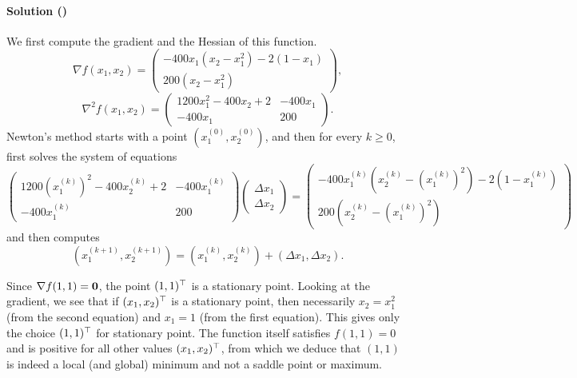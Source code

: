 \documentclass{article}
\newcounter{problems}
\renewcommand{\solution}[1]{\paragraph{Solution (\theproblems)}\addtocounter{problems}{1}\label{#1}}
\begin{document}
\solution{p5} We first compute the gradient and the Hessian of this function.
\begin{equation}\label{eq:grad}\tag{1}
 \nabla f(x_1,x_2) = \begin{pmatrix}
                                  -400 x_1(x_2-x_1^2)-2(1-x_1)\\
                                  200(x_2-x_1^2)
                                 \end{pmatrix},
\end{equation}
\begin{equation*}
 \nabla^2 f(x_1,x_2) = \begin{pmatrix}
                        1200x_1^2-400x_2+2 & -400x_1\\
                        -400x_1 & 200
                       \end{pmatrix}.
\end{equation*}
Newton's method starts with a point $(x_1^{(0)},x_2^{(0)})$, and then for every $k\geq 0$, first solves the system of equations
\begin{equation*}
 \begin{pmatrix}
                        1200(x_1^{(k)})^2-400x_2^{(k)}+2 & -400x_1^{(k)}\\
                        -400x_1^{(k)} & 200
                       \end{pmatrix} 
 \begin{pmatrix}
  \Delta x_1\\ \Delta x_2
 \end{pmatrix}
= \begin{pmatrix}
   -400 x_1^{(k)}(x_2^{(k)}-(x_1^{(k)})^2)-2(1-x_1^{(k)})\\
                                  200(x_2^{(k)}-(x_1^{(k)})^2)
  \end{pmatrix}
\end{equation*}
and then computes
\begin{equation*}
 (x_1^{(k+1)},x_2^{(k+1)}) = (x_1^{(k)},x_2^{(k)}) + (\Delta x_1,\Delta x_2).
\end{equation*}

Since $\nabla f(1,1)=\bm{0}$, the point $(1,1)^{\top}$ is a stationary point. Looking at the gradient, we see that if $(x_1,x_2)^{\top}$ is a stationary point, then necessarily $x_2=x_1^2$ (from the second equation) and $x_1=1$ (from the first equation). This gives only the choice $(1,1)^{\top}$ for stationary point. The function itself satisfies $f(1,1)=0$ and is positive for all other values $(x_1,x_2)^{\top}$, from which we deduce that $(1,1)$ is indeed a local (and global) minimum and not a saddle point or maximum. 
\end{document}
